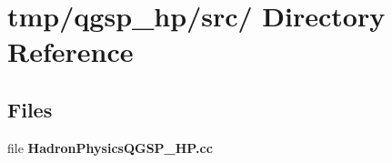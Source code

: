 \section{tmp/qgsp\_\-hp/src/ Directory Reference}
\label{dir_000007}
\subsection*{Files}
\begin{CompactItemize}
\item 
file {\bf HadronPhysicsQGSP_HP.cc}
\end{CompactItemize}
